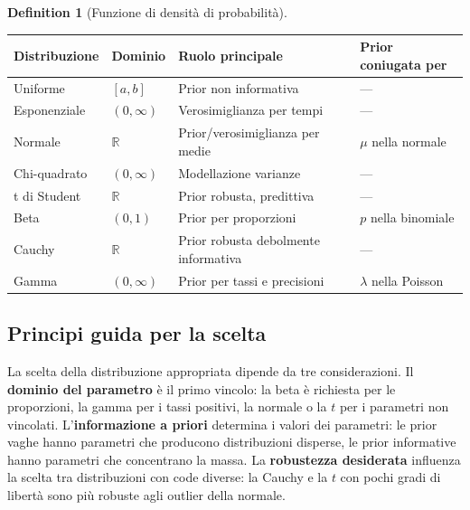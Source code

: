 \documentclass[
  letterpaper,
  DIV=11,
  numbers=noendperiod,
  oneside]{scrreprt}
\theoremstyle{definition}
\theoremstyle{plain}
\theoremstyle{definition}
\newtheorem{definition}{Definition}[chapter]
\theoremstyle{remark}
\begin{document}
\begin{definition}[Funzione di densità di
probabilità]
\begin{longtable}[]{@{}
  >{\raggedright\arraybackslash}p{}
  >{\raggedright\arraybackslash}p{}
  >{\raggedright\arraybackslash}p{}
  >{\raggedright\arraybackslash}p{}@{}}
\toprule\noalign{}
\begin{minipage}[b]{\linewidth}\raggedright
Distribuzione
\end{minipage} & \begin{minipage}[b]{\linewidth}\raggedright
Dominio
\end{minipage} & \begin{minipage}[b]{\linewidth}\raggedright
Ruolo principale
\end{minipage} & \begin{minipage}[b]{\linewidth}\raggedright
Prior coniugata per
\end{minipage} \\
\midrule\noalign{}
\endhead
\bottomrule\noalign{}
\endlastfoot
Uniforme & \([a, b]\) & Prior non informativa & --- \\
Esponenziale & \((0, \infty)\) & Verosimiglianza per tempi & --- \\
Normale & \(\mathbb{R}\) & Prior/verosimiglianza per medie & \(\mu\)
nella normale \\
Chi-quadrato & \((0, \infty)\) & Modellazione varianze & --- \\
t di Student & \(\mathbb{R}\) & Prior robusta, predittiva & --- \\
Beta & \((0, 1)\) & Prior per proporzioni & \(p\) nella binomiale \\
Cauchy & \(\mathbb{R}\) & Prior robusta debolmente informativa & --- \\
Gamma & \((0, \infty)\) & Prior per tassi e precisioni & \(\lambda\)
nella Poisson \\
\end{longtable}

\subsection*{Principi guida per la
scelta}\label{principi-guida-per-la-scelta}

La scelta della distribuzione appropriata dipende da tre considerazioni.
Il \textbf{dominio del parametro} è il primo vincolo: la beta è
richiesta per le proporzioni, la gamma per i tassi positivi, la normale
o la \(t\) per i parametri non vincolati. L'\textbf{informazione a
priori} determina i valori dei parametri: le prior vaghe hanno parametri
che producono distribuzioni disperse, le prior informative hanno
parametri che concentrano la massa. La \textbf{robustezza desiderata}
influenza la scelta tra distribuzioni con code diverse: la Cauchy e la
\(t\) con pochi gradi di libertà sono più robuste agli outlier della
normale.


\end{definition}
\end{document}
